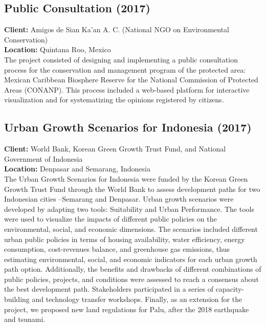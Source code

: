 \documentclass[
	a4paper,
	12pt,
	unnumberedsections,
]{CSSullivanBusinessReport}
\begin{document}
\subsection{Public Consultation (2017)}
\textbf{Client:}  Amigos de Sian Ka’an A. C. (National NGO on Environmental Conservation) \\
\textbf{Location:}  Quintana Roo, Mexico    \\[0.5em]
 The project consisted of designing and implementing a public consultation process for the conservation and management program of the protected area: Mexican Caribbean Biosphere Reserve for the National Commission of Protected Areas (CONANP). This process included a web-based platform for interactive visualization and for systematizing the opinions registered by citizens.

\subsection{Urban Growth Scenarios for Indonesia (2017)}
\textbf{Client:}  World Bank, Korean Green Growth Trust Fund, and National Government of Indonesia \\
\textbf{Location:}  Denpasar and Semarang, Indonesia \\[0.5em]
 The Urban Growth Scenarios for Indonesia were funded by the Korean Green Growth Trust Fund through the World Bank to assess development paths for two Indonesian cities –Semarang and Denpasar. Urban growth scenarios were developed by adapting two tools: Suitability and Urban Performance. The tools were used to visualize the impacts of different public policies on the environmental, social, and economic dimensions. The scenarios included different urban public policies in terms of housing availability, water efficiency, energy consumption, cost-revenues balance, and greenhouse gas emissions, thus estimating environmental, social, and economic indicators for each urban growth path option. Additionally, the benefits and drawbacks of different combinations of public policies, projects, and conditions were assessed to reach a consensus about the best development path. Stakeholders participated in a series of capacity-building and technology transfer workshops.  Finally, as an extension for the project, we proposed new land regulations for Palu, after the 2018 earthquake and tsunami.
\end{document}
